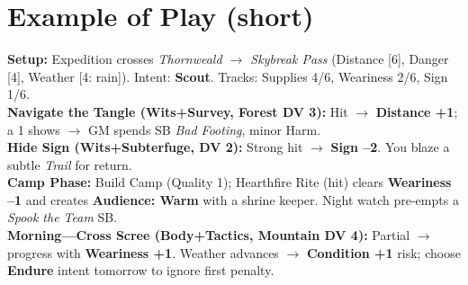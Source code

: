 \documentclass[11pt]{article}
\begin{document}
\section{Example of Play (short)}
\textbf{Setup:} Expedition crosses \emph{Thornweald $\to$ Skybreak Pass} (Distance [6], Danger [4], Weather [4: rain]). Intent: \textbf{Scout}. Tracks: Supplies 4/6, Weariness 2/6, Sign 1/6.\\
\textbf{Navigate the Tangle (Wits+Survey, Forest DV 3):} Hit $\to$ \textbf{Distance +1}; a 1 shows $\to$ GM spends SB \emph{Bad Footing}, minor Harm.\\
\textbf{Hide Sign (Wits+Subterfuge, DV 2):} Strong hit $\to$ \textbf{Sign --2}. You blaze a subtle \emph{Trail} for return.\\
\textbf{Camp Phase:} Build Camp (Quality 1); Hearthfire Rite (hit) clears \textbf{Weariness --1} and creates \textbf{Audience: Warm} with a shrine keeper. Night watch pre-empts a \emph{Spook the Team} SB.\\
\textbf{Morning---Cross Scree (Body+Tactics, Mountain DV 4):} Partial $\to$ progress with \textbf{Weariness +1}. Weather advances $\to$ \textbf{Condition +1} risk; choose \textbf{Endure} intent tomorrow to ignore first penalty.
\end{document}
